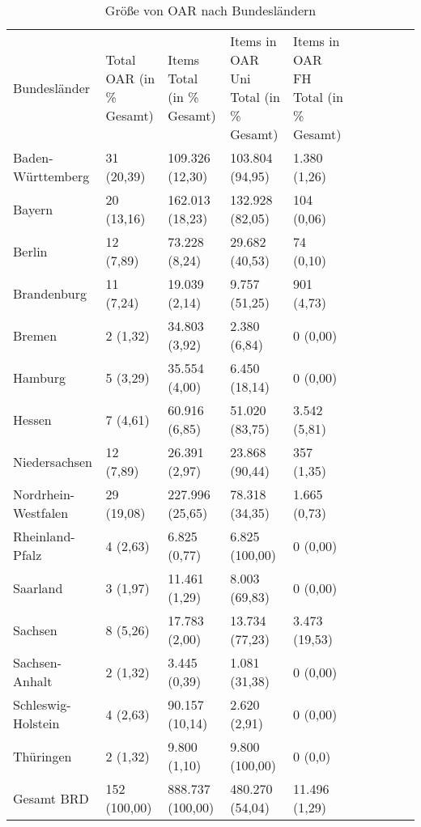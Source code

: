 \documentclass[a4paper,
fontsize=11pt,
oneside,
numbers=noperiodatend,
parskip=half-,
bibliography=totoc,
final
]{scrartcl}
\begin{document}
\begin{table}[ht]
\centering
\small
\begin{tabular}{p{3cm}p{3cm}p{3cm}p{3cm}p{3cm} lrrrr}
  \toprule
Bundesländer & Total OAR (in \% Gesamt)  & Items Total (in \% Gesamt)  & Items in OAR Uni Total (in \% Gesamt)  & Items in OAR FH Total (in \% Gesamt)  \\ 
    \cmidrule(r){1-1} \cmidrule(r){2-2} \cmidrule(r){3-3} \cmidrule(r){4-4} \cmidrule(r){5-5} 
Baden-Württemberg & 31 (20,39) & 109.326 (12,30) & 103.804 (94,95) & 1.380 (1,26) \\ 
  Bayern & 20 (13,16) & 162.013 (18,23) & 132.928 (82,05) & 104 (0,06) \\ 
  Berlin & 12 (7,89) & 73.228 (8,24) & 29.682 (40,53) & 74 (0,10) \\ 
  Brandenburg & 11 (7,24) & 19.039 (2,14) & 9.757 (51,25) & 901 (4,73) \\ 
  Bremen & 2 (1,32) & 34.803 (3,92) & 2.380 (6,84) & 0 (0,00) \\ 
  Hamburg & 5 (3,29) & 35.554 (4,00) & 6.450 (18,14) & 0 (0,00) \\ 
  Hessen & 7 (4,61) & 60.916 (6,85) & 51.020 (83,75) & 3.542 (5,81) \\ 
  Niedersachsen & 12 (7,89) & 26.391 (2,97) & 23.868 (90,44) & 357 (1,35) \\ 
  Nordrhein-Westfalen & 29 (19,08) & 227.996 (25,65) & 78.318 (34,35) & 1.665 (0,73) \\ 
  Rheinland-Pfalz & 4 (2,63) & 6.825 (0,77) & 6.825 (100,00) & 0 (0,00) \\ 
  Saarland & 3 (1,97) & 11.461 (1,29) & 8.003 (69,83) & 0 (0,00) \\ 
  Sachsen & 8 (5,26) & 17.783 (2,00) & 13.734 (77,23) & 3.473 (19,53) \\ 
  Sachsen-Anhalt & 2 (1,32) & 3.445 (0,39) & 1.081 (31,38) & 0 (0,00) \\ 
  Schleswig-Holstein & 4 (2,63) & 90.157 (10,14) & 2.620 (2,91) & 0 (0,00) \\ 
  Thüringen & 2 (1,32) & 9.800 (1,10) & 9.800 (100,00) & 0 (0,0) \\   \cmidrule(r){1-1} \cmidrule(r){2-2} \cmidrule(r){3-3} \cmidrule(r){4-4} \cmidrule(r){5-5} 
  Gesamt BRD & 152 (100,00) & 888.737 (100,00) & 480.270 (54,04) & 11.496 (1,29) \\ 
   \bottomrule
\end{tabular}
\caption{Größe von OAR nach Bundesländern}
\end{table}
\end{document}
